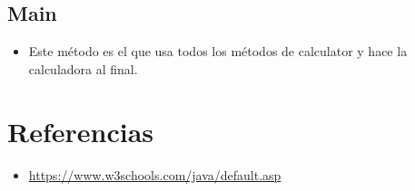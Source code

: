 \documentclass{article}
\begin{document}
	\subsection{Main}
	
	\begin{itemize}
		\item Este método es el que usa todos los métodos de calculator y hace la calculadora al final.
	\end{itemize}
	
	\clearpage
\section{Referencias}
\begin{itemize}			
	\item \url{https://www.w3schools.com/java/default.asp}
\end{itemize}	
	
%
%
%
			
\end{document}
